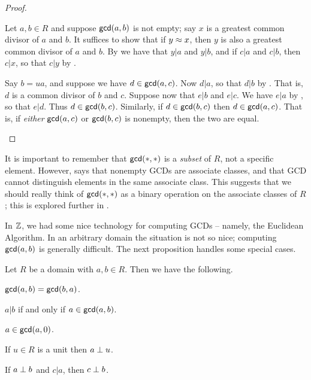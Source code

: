 \begin{proof}
\begin{inlineproplist}
\item Let \(a,b \in R\) and suppose \(\mathsf{gcd}(a, b)\) is not empty; say \(x\) is a greatest common divisor of \(a\) and \(b\).
It suffices to show that if \(y \approx x\), then \(y\) is also a greatest common divisor of \(a\) and \(b\). By
 we have that \(y|a\) and \(y|b\), and if \(c|a\) and \(c|b\), then \(c|x\), so that \(c|y\) by .
\item Say \(b = ua\), and suppose we have \(d \in \mathsf{gcd}(a, c)\).
Now \(d|a\), so that \(d|b\) by .
That is, \(d\) is a common divisor of \(b\) and \(c\).
Suppose now that \(e|b\) and \(e|c\).
We have \(e|a\) by , so that \(e|d\).
Thus \(d \in \mathsf{gcd}(b, c)\).
Similarly, if \(d \in \mathsf{gcd}(b, c)\) then \(d \in \mathsf{gcd}(a, c)\).
That is, if \emph{either} \(\mathsf{gcd}(a, c)\) or \(\mathsf{gcd}(b, c)\) is nonempty, then the two are equal.
\end{inlineproplist}
\end{proof}

It is important to remember that \(\mathsf{gcd}(\ast, \ast)\) is a \emph{subset} of \(R\), not a specific element.
However,  says that nonempty GCDs are associate classes, and that GCD cannot distinguish elements in the same associate class.
This suggests that we should really think of \(\mathsf{gcd}(\ast, \ast)\) as a binary operation on the associate classes of \(R\); this is explored further in .

In \(\mathbb{Z}\), we had some nice technology for computing GCDs -- namely, the Euclidean Algorithm.
In an arbitrary domain the situation is not so nice; computing \(\mathsf{gcd}(a, b)\) is generally difficult.
The next proposition handles some special cases.

\begin{prop} \label{prop:gcd-basics}
Let \(R\) be a domain with \(a,b \in R\).
Then we have the following.
\begin{proplist*}
\item \(\mathsf{gcd}(a, b) = \mathsf{gcd}(b, a)\).
\item \(a|b\) if and only if \(a \in \mathsf{gcd}(a, b)\).
\item \(a \in \mathsf{gcd}(a, 0)\).
\item If \(u \in R\) is a unit then \(a \perp u\).
\item \label{prop:gcd-basics:coprime-factor} If \(a \perp b\) and \(c|a\), then \(c \perp b\).
\end{proplist*}
\end{prop}

